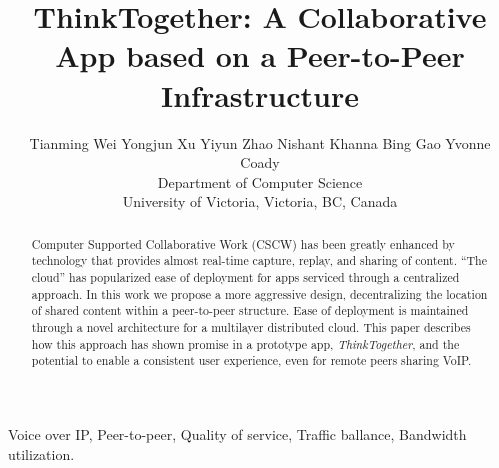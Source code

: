 \documentclass[conference]{IEEEtran}
\title{ThinkTogether: A Collaborative App based on a Peer-to-Peer 
Infrastructure}
\author{\qquad Tianming Wei \qquad Yongjun Xu \qquad Yiyun Zhao \qquad Nishant Khanna \qquad Bing Gao \qquad Yvonne Coady\\
Department of Computer Science\\
University of Victoria, Victoria, BC, Canada\\}
\begin{document}
\maketitle
\pagestyle{plain}

\begin{abstract}
\begin{comment}
With the enhancement in technology every day there are so many applications 
being developed every day. There are a lot of applications that have been 
developed to record presentations and to upload content onto the server for 
later reference. ThinkTogether is much more than that. Not only does it support 
basic functions like giving presentation, and adding comments and marking 
important points, ThinkTogether also provides multilayer function, which achieve 
better performance by separating different users into multiple layers. As fully 
functionable as the app already is, we still want to take it to the next level. 
In this study, we propose a network mechanism using VoIP technology, to 
introduce voice streaming feature into existing application developed by Two 
Tall Totems.
\end{comment}
Computer Supported Collaborative Work (CSCW) has been greatly enhanced by 
technology that provides almost real-time capture, replay, and sharing of 
content.   “The cloud” has popularized ease of deployment for apps serviced 
through a centralized approach.  In this work we propose a more aggressive 
design, decentralizing the location of shared content within a peer-to-peer 
structure.  Ease of deployment is maintained through a novel architecture for a 
multilayer distributed cloud.  This paper describes how this approach has shown 
promise in a prototype app, {\em ThinkTogether}, and the potential to enable a 
consistent user experience, even for remote peers sharing VoIP.

\end{abstract}

\begin{IEEEkeywords}
  Voice over IP, Peer-to-peer, Quality of service, Traffic ballance, Bandwidth utilization.
\end{IEEEkeywords}




\end{document}
